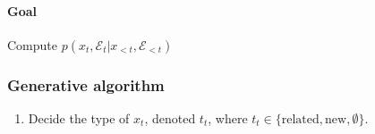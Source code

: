 \documentclass{article}
\newcommand{\E}{\mathcal{E}}
\newcommand{\obs}{{<t}}
\newcommand{\related}{\text{related}}
\newcommand{\new}{\text{new}}
\newcommand{\noent}{\emptyset}
\begin{document}
\paragraph{Goal} Compute $p(x_t, \E_t | x_\obs, \E_\obs)$

\subsubsection{Generative algorithm}
\begin{enumerate}
  \item Decide the type of $x_t$, denoted $t_t$, where
    $t_t \in \{\related, \new, \noent\}$.
\end{enumerate}
\end{document}
